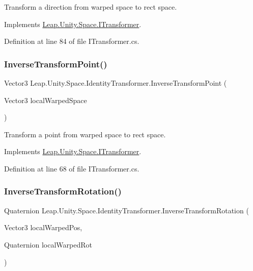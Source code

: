 Transform a direction from warped space to rect space. 



Implements \mbox{\hyperlink{interface_leap_1_1_unity_1_1_space_1_1_i_transformer_aa555a28ab51ed506732bb88756f06168}{Leap.\+Unity.\+Space.\+I\+Transformer}}.



Definition at line 84 of file I\+Transformer.\+cs.

\mbox{\label{class_leap_1_1_unity_1_1_space_1_1_identity_transformer_a404c960dbb06676aee1e634957349e4b}} 
\subsubsection{\texorpdfstring{InverseTransformPoint()}{InverseTransformPoint()}}
{\footnotesize\ttfamily Vector3 Leap.\+Unity.\+Space.\+Identity\+Transformer.\+Inverse\+Transform\+Point (\begin{DoxyParamCaption}\item[{Vector3}]{local\+Warped\+Space }\end{DoxyParamCaption})}



Transform a point from warped space to rect space. 



Implements \mbox{\hyperlink{interface_leap_1_1_unity_1_1_space_1_1_i_transformer_ad919653073748169561e99cace4f5931}{Leap.\+Unity.\+Space.\+I\+Transformer}}.



Definition at line 68 of file I\+Transformer.\+cs.

\mbox{\label{class_leap_1_1_unity_1_1_space_1_1_identity_transformer_acd239c878d3c9edba001ed51f4511c1a}} 
\subsubsection{\texorpdfstring{InverseTransformRotation()}{InverseTransformRotation()}}
{\footnotesize\ttfamily Quaternion Leap.\+Unity.\+Space.\+Identity\+Transformer.\+Inverse\+Transform\+Rotation (\begin{DoxyParamCaption}\item[{Vector3}]{local\+Warped\+Pos,  }\item[{Quaternion}]{local\+Warped\+Rot }\end{DoxyParamCaption})}



